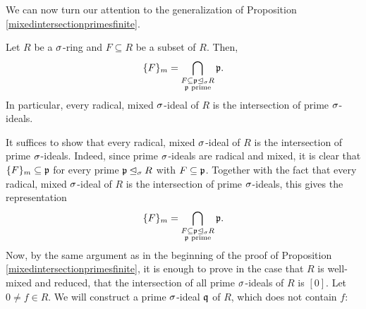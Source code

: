 We can now turn our attention to the generalization of Proposition \ref{mixedintersectionprimesfinite}. 


\begin{theorem}\label{intersectionprimes}
Let $R$ be a $\sigma$-ring and $F \subseteq R$ be a subset of $R$. Then, 
\begin{align*} \{F\}_m = \bigcap_{\substack{F \subseteq \mathfrak{p} \unlhd_{\sigma} R \\ \mathfrak{p} \text{ prime}}} \mathfrak{p}. \end{align*}
In particular, every radical, mixed $\sigma$-ideal of $R$ is the intersection of prime $\sigma$-ideals.
\begin{bew}
It suffices to show that every radical, mixed $\sigma$-ideal of $R$ is the intersection of prime $\sigma$-ideals.
Indeed, since prime $\sigma$-ideals are radical and mixed, it is clear that $\{F\}_m \subseteq \mathfrak{p}$ for every prime $\mathfrak{p} \unlhd_{\sigma} R$ with $F \subseteq \mathfrak{p}$. Together with the fact that every radical, mixed $\sigma$-ideal of $R$ is the intersection of prime $\sigma$-ideals, this gives the representation 
\begin{align*} \{F\}_m = \bigcap_{\substack{F \subseteq \mathfrak{p} \unlhd_{\sigma} R \\ \mathfrak{p} \text{ prime}}} \mathfrak{p}. \end{align*}
Now, by the same argument as in the beginning of the proof of Proposition \ref{mixedintersectionprimesfinite}, it is enough to prove in the case that $R$ is well-mixed and reduced, that the intersection of all prime $\sigma$-ideals of $R$ is $[0]$.
Let $0 \neq f \in R$. We will construct a prime $\sigma$-ideal $\mathfrak{q}$ of $R$, which does not contain $f$: 


\end{bew}
\end{theorem}
